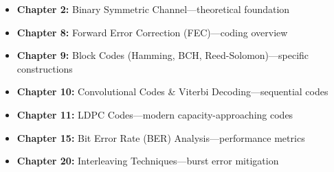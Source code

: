 \begin{itemize}
\item \textbf{Chapter 2:} Binary Symmetric Channel---theoretical foundation
\item \textbf{Chapter 8:} Forward Error Correction (FEC)---coding overview
\item \textbf{Chapter 9:} Block Codes (Hamming, BCH, Reed-Solomon)---specific constructions
\item \textbf{Chapter 10:} Convolutional Codes \& Viterbi Decoding---sequential codes
\item \textbf{Chapter 11:} LDPC Codes---modern capacity-approaching codes
\item \textbf{Chapter 15:} Bit Error Rate (BER) Analysis---performance metrics
\item \textbf{Chapter 20:} Interleaving Techniques---burst error mitigation
\end{itemize}
